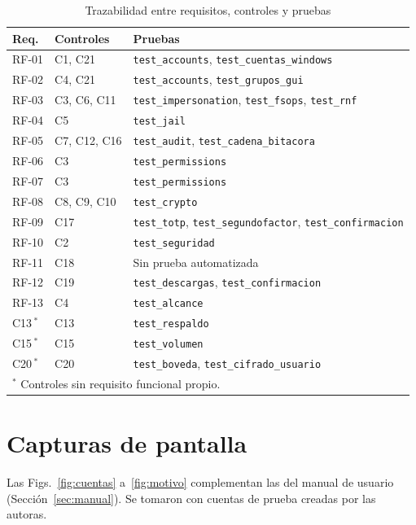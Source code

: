 \documentclass[conference]{IEEEtran}
\begin{document}
\begin{table}[!htb]
\caption{Trazabilidad entre requisitos, controles y pruebas}
\label{tab:traza}
\centering
\footnotesize
\setlength{\tabcolsep}{3pt}
\begin{tabular}{|l|p{1.6cm}|>{\raggedright\arraybackslash}p{4.6cm}|}
\hline
\textbf{Req.} & \textbf{Controles} & \textbf{Pruebas} \\
\hline
RF-01 & C1, C21 & \texttt{test\_accounts}, \texttt{test\_cuentas\_windows} \\
\hline
RF-02 & C4, C21 & \texttt{test\_accounts}, \texttt{test\_grupos\_gui} \\
\hline
RF-03 & C3, C6, C11 & \texttt{test\_impersonation}, \texttt{test\_fsops}, \texttt{test\_rnf} \\
\hline
RF-04 & C5 & \texttt{test\_jail} \\
\hline
RF-05 & C7, C12, C16 & \texttt{test\_audit}, \texttt{test\_cadena\_bitacora} \\
\hline
RF-06 & C3 & \texttt{test\_permissions} \\
\hline
RF-07 & C3 & \texttt{test\_permissions} \\
\hline
RF-08 & C8, C9, C10 & \texttt{test\_crypto} \\
\hline
RF-09 & C17 & \texttt{test\_totp}, \texttt{test\_segundofactor}, \texttt{test\_confirmacion} \\
\hline
RF-10 & C2 & \texttt{test\_seguridad} \\
\hline
RF-11 & C18 & Sin prueba automatizada \\
\hline
RF-12 & C19 & \texttt{test\_descargas}, \texttt{test\_confirmacion} \\
\hline
RF-13 & C4 & \texttt{test\_alcance} \\
\hline
C13\,$^{*}$ & C13 & \texttt{test\_respaldo} \\
\hline
C15\,$^{*}$ & C15 & \texttt{test\_volumen} \\
\hline
C20\,$^{*}$ & C20 & \texttt{test\_boveda}, \texttt{test\_cifrado\_usuario} \\
\hline
\multicolumn{3}{|l|}{\scriptsize $^{*}$ Controles sin requisito funcional propio.} \\
\hline
\end{tabular}
\end{table}

\section{Capturas de pantalla}
\label{anx:capturas}
Las Figs.~\ref{fig:cuentas} a~\ref{fig:motivo} complementan las del manual de usuario (Sección~\ref{sec:manual}). Se tomaron con cuentas de prueba creadas por las autoras.
\end{document}
